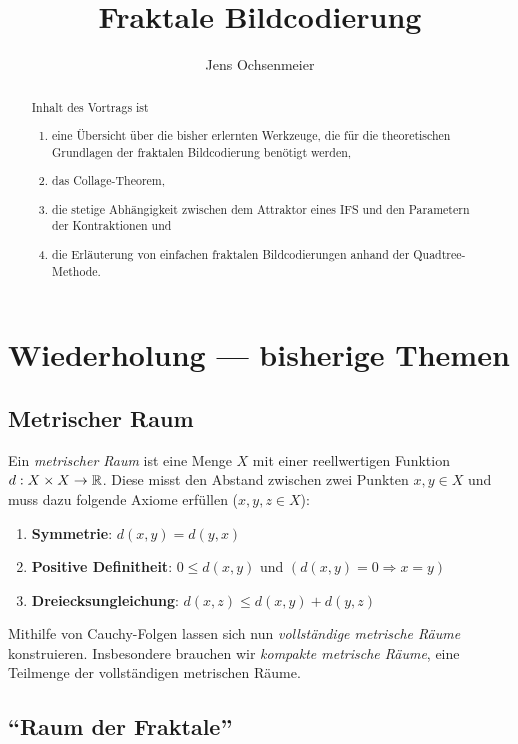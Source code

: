 \documentclass[afourpaper]{tufte-handout}
\title{Fraktale Bildcodierung}
\author{Jens Ochsenmeier}
\date{}
\begin{document}
\maketitle

\begin{abstract}
\noindent
  Inhalt des Vortrags ist
  \begin{enumerate}
    \item eine Übersicht über die bisher erlernten Werkzeuge, die für die theoretischen Grundlagen der fraktalen Bildcodierung benötigt werden,
    \item das Collage-Theorem,
    \item die stetige Abhängigkeit zwischen dem Attraktor eines IFS und den Parametern der Kontraktionen und
    \item die Erläuterung von einfachen fraktalen Bildcodierungen anhand der Quadtree-Methode.
  \end{enumerate}
\end{abstract}

\section{Wiederholung --- bisherige Themen}

\subsection{Metrischer Raum}

Ein \emph{metrischer Raum} ist eine Menge \( X \) mit einer reellwertigen Funktion \( d: X \times X \to \mathbb{R} \). Diese misst den Abstand zwischen zwei Punkten \( x,y \in X \) und muss dazu folgende Axiome erfüllen (\( x,y,z \in X \)):
\begin{enumerate}
  \item \textbf{Symmetrie}: \( d(x,y) = d(y,x) \)
  \item \textbf{Positive Definitheit}: \( 0 \leq d(x,y) \) und \( (d(x,y) = 0 \Rightarrow x = y) \)
  \item \textbf{Dreiecksungleichung}: \( d(x,z) \leq d(x,y) + d(y,z) \)
\end{enumerate}

Mithilfe von Cauchy-Folgen lassen sich nun \emph{vollständige metrische Räume} konstruieren. Insbesondere brauchen wir \emph{kompakte metrische Räume}, eine Teilmenge der vollständigen metrischen Räume.

\subsection{``Raum der Fraktale''}
\end{document}
